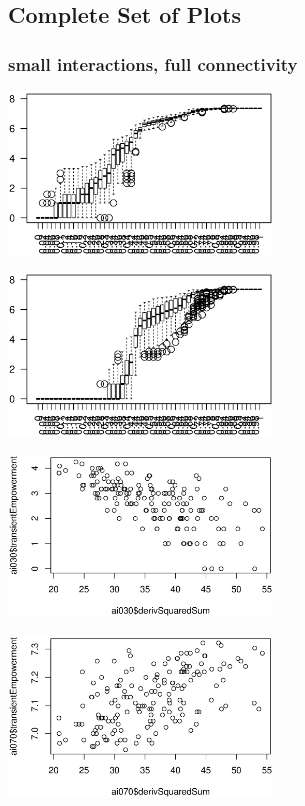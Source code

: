 \documentclass[conference]{IEEEtran}
\begin{document}



\cleardoublepage

\appendix

\subsection{Complete Set of Plots}


\subsubsection{small interactions, full connectivity}

\rule{0pt}{0pt}

\centerline{\includegraphics[width=7cm]{n08_full_small_emp.eps}}

\centerline{\includegraphics[width=7cm]{n08_full_small_empsust.eps}}

\centerline{\includegraphics[width=7cm]{n08_full_small_corr_dss_emp_ai030.eps}}

\centerline{\includegraphics[width=7cm]{n08_full_small_corr_dss_emp_ai070.eps}}
\end{document}
